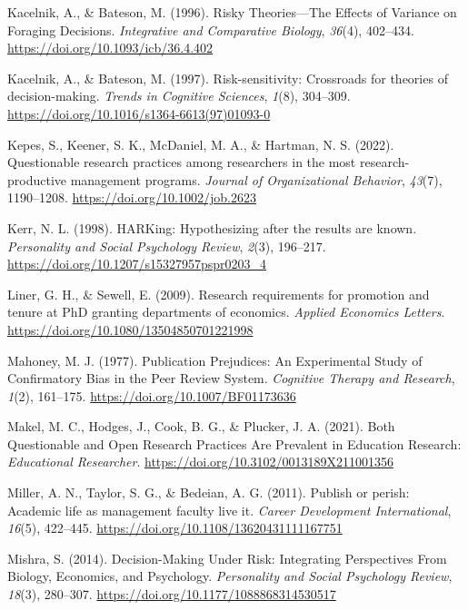 \documentclass[
  ,man,mask,floatsintext]{apa6}
\newlength{\cslhangindent}
\newlength{\cslentryspacingunit} %
\newenvironment{CSLReferences}[2] %
 {%
  \setlength{\parindent}{0pt}
  \ifodd #1
  \let\oldpar\par
  \def\par{\hangindent=\cslhangindent\oldpar}
  \fi
  \setlength{\parskip}{#2\cslentryspacingunit}
 }%
 {}
\begin{document}
\begin{CSLReferences}{1}{0}
\leavevmode{}%
Kacelnik, A., \& Bateson, M. (1996). Risky {Theories}---{The Effects} of {Variance} on {Foraging Decisions}. \emph{Integrative and Comparative Biology}, \emph{36}(4), 402--434. \url{https://doi.org/10.1093/icb/36.4.402}

\leavevmode{}%
Kacelnik, A., \& Bateson, M. (1997). Risk-sensitivity: Crossroads for theories of decision-making. \emph{Trends in Cognitive Sciences}, \emph{1}(8), 304--309. \url{https://doi.org/10.1016/s1364-6613(97)01093-0}

\leavevmode{}%
Kepes, S., Keener, S. K., McDaniel, M. A., \& Hartman, N. S. (2022). Questionable research practices among researchers in the most research-productive management programs. \emph{Journal of Organizational Behavior}, \emph{43}(7), 1190--1208. \url{https://doi.org/10.1002/job.2623}

\leavevmode{}%
Kerr, N. L. (1998). {HARKing}: {Hypothesizing} after the results are known. \emph{Personality and Social Psychology Review}, \emph{2}(3), 196--217. \url{https://doi.org/10.1207/s15327957pspr0203_4}

\leavevmode{}%
Liner, G. H., \& Sewell, E. (2009). Research requirements for promotion and tenure at {PhD} granting departments of economics. \emph{Applied Economics Letters}. \url{https://doi.org/10.1080/13504850701221998}

\leavevmode{}%
Mahoney, M. J. (1977). Publication {Prejudices}: {An Experimental Study} of {Confirmatory Bias} in the {Peer Review System}. \emph{Cognitive Therapy and Research}, \emph{1}(2), 161--175. \url{https://doi.org/10.1007/BF01173636}

\leavevmode{}%
Makel, M. C., Hodges, J., Cook, B. G., \& Plucker, J. A. (2021). Both {Questionable} and {Open Research Practices Are Prevalent} in {Education Research}: \emph{Educational Researcher}. \url{https://doi.org/10.3102/0013189X211001356}

\leavevmode{}%
Miller, A. N., Taylor, S. G., \& Bedeian, A. G. (2011). Publish or perish: Academic life as management faculty live it. \emph{Career Development International}, \emph{16}(5), 422--445. \url{https://doi.org/10.1108/13620431111167751}

\leavevmode{}%
Mishra, S. (2014). Decision-{Making Under Risk}: {Integrating Perspectives From Biology}, {Economics}, and {Psychology}. \emph{Personality and Social Psychology Review}, \emph{18}(3), 280--307. \url{https://doi.org/10.1177/1088868314530517}


\end{CSLReferences}
\end{document}
